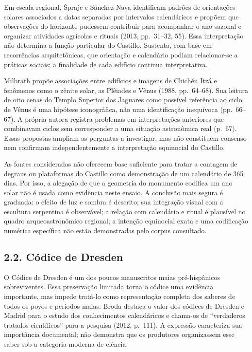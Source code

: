 \documentclass[
  brazilian,
]{article}
\begin{document}
Em escala regional, Šprajc e Sánchez Nava identificam padrões de
orientações solares associados a datas separadas por intervalos
calendáricos e propõem que observações do horizonte pudessem contribuir
para acompanhar o ano sazonal e organizar atividades agrícolas e rituais
(2013, pp.~31--32, 55). Essa interpretação não determina a função
particular do Castillo. Sustenta, com base em recorrências
arquitetônicas, que orientação e calendário podiam relacionar-se a
práticas sociais; a finalidade de cada edifício continua interpretativa.

Milbrath propõe associações entre edifícios e imagens de Chichén Itzá e
fenômenos como o zênite solar, as Plêiades e Vênus (1988, pp.~64--68).
Sua leitura de oito cenas do Templo Superior dos Jaguares como possível
referência ao ciclo de Vênus é uma hipótese iconográfica, não uma
identificação inequívoca (pp.~66--67). A própria autora registra
problemas em interpretações anteriores que combinavam ciclos sem
corresponder a uma situação astronômica real (p.~67). Essas propostas
ampliam as perguntas a investigar, mas não constituem consenso nem
confirmam independentemente a interpretação equinocial do Castillo.

As fontes consideradas não oferecem base suficiente para tratar a
contagem de degraus ou plataformas do Castillo como demonstração de um
calendário de 365 dias. Por isso, a alegação de que a geometria do
monumento codifica um ano solar não é usada como evidência neste ensaio.
A conclusão mais segura é graduada: o efeito de luz e sombra é descrito;
sua integração visual com a escultura serpentina é observável; a relação
com calendário e ritual é plausível no quadro arqueoastronômico
regional; a intenção equinocial exata e uma codificação numérica
específica não estão demonstradas pelo corpus consultado.

\subsection{2.2. Códice de Dresden}\label{cuxf3dice-de-dresden}

O Códice de Dresden é um dos poucos manuscritos maias pré-hispânicos
sobreviventes. Essa preservação limitada torna o códice uma evidência
importante, mas impede tratá-lo como representação completa dos saberes
de todos os povos e períodos maias. Broda destaca o valor dos códices de
Dresden e Madrid para o estudo dos conhecimentos calendáricos e chama-os
de ``verdaderos tratados científicos'' para a pesquisa (2012, p.~111). A
expressão caracteriza sua importância documental; não demonstra que os
produtores organizassem esse saber sob a categoria moderna de ciência.
\end{document}
